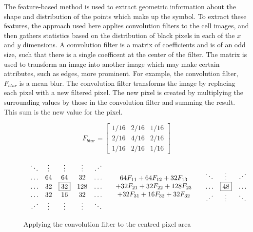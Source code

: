 
The feature-based method is used to extract geometric information about the
shape and distribution of the points which make up the symbol. To extract these
features, the approach used here applies convolution filters to the cell
images, and then gathers statistics based on the distribution of black pixels
in each of the $x$ and $y$ dimensions. A convolution filter is a matrix of
coefficients and is of an odd size, such that there is a single coefficent at
the center of the filter. The matrix is used to transform an image into another
image which may make certain attributes, such as edges, more prominent.  For
example, the convolution filter, $F_{blur}$ is a mean blur. The convolution
filter transforms the image by replacing each pixel with a new filtered pixel.
The new pixel is created by multiplying the surrounding values by those in the
convolution filter and summing the result. This sum is the new value for the
pixel.

\[ F_{blur} = \left[
\begin{array}{ccc}
1/16 & 2/16 & 1/16 \\
2/16 & 4/16 & 2/16 \\
1/16 & 2/16 & 1/16
\end{array}\right]
\]

\begin{figure}[h] \[
\begin{array}{lcr}
\begin{array}{ccccc}
\ddots & \vdots & \vdots & \vdots & \iddots \\
\ldots & 64 & 64 & 32 & \ldots \\
\ldots & 32 & \fbox{32} & 128 & \ldots \\
\ldots & 32 & 16 & 32 & \ldots \\
\iddots & \vdots & \vdots & \vdots & \ddots \\
\end{array} &
\begin{array}{c}
64F_{11} + 64F_{12} + 32F_{13} \\
+ 32F_{21} + 32F_{22} + 128F_{23} \\
+ 32F_{31} + 16F_{32} + 32F_{32} \\
\end{array} &
\begin{array}{ccccc}
\ddots & \vdots & \iddots \\
\ldots &  \fbox{48}  & \ldots \\
\iddots & \vdots & \ddots \\
\end{array}
\end{array} \]
\caption{Applying the convolution filter to the centred pixel area}
\label{figure:convolution}
\end{figure}

